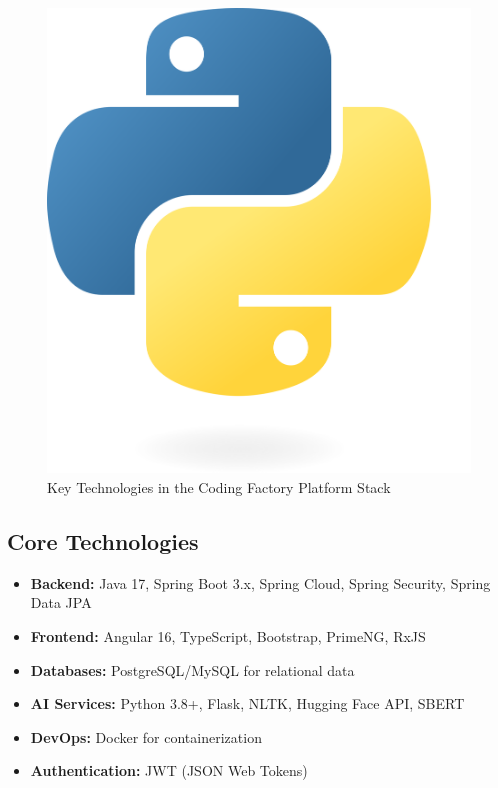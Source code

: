 \documentclass[12pt,a4paper]{report}
\begin{document}
\begin{figure}[!htbp]
\vspace{0.5cm}
\begin{minipage}{0.45\textwidth}
    \centering
    \includegraphics[width=\textwidth]{media/Python-logo-notext.svg.png}
\end{minipage}
\caption{Key Technologies in the Coding Factory Platform Stack}
\label{fig:tech-stack-diagram}
\end{figure}

\subsection{Core Technologies}

\begin{itemize}
    \item \textbf{Backend:} Java 17, Spring Boot 3.x, Spring Cloud, Spring Security, Spring Data JPA
    \item \textbf{Frontend:} Angular 16, TypeScript, Bootstrap, PrimeNG, RxJS
    \item \textbf{Databases:} PostgreSQL/MySQL for relational data
    \item \textbf{AI Services:} Python 3.8+, Flask, NLTK, Hugging Face API, SBERT
    \item \textbf{DevOps:} Docker for containerization
    \item \textbf{Authentication:} JWT (JSON Web Tokens)
\end{itemize}
\end{document}
